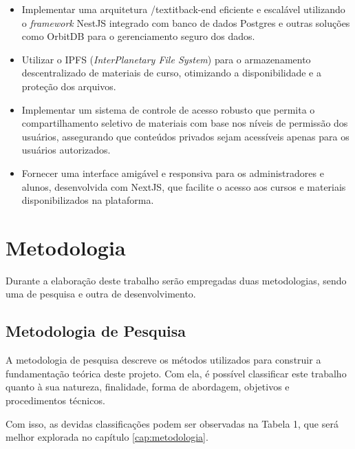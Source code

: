 \begin{itemize}
    \item Implementar uma arquitetura /textit{back-end} eficiente e escalável utilizando o \textit{framework} NestJS integrado com banco de dados Postgres e outras soluções como OrbitDB para o gerenciamento seguro dos dados.
    \item Utilizar o IPFS (\textit{InterPlanetary File System}) para o armazenamento descentralizado de materiais de curso, otimizando a disponibilidade e a proteção dos arquivos.
    \item Implementar um sistema de controle de acesso robusto que permita o compartilhamento seletivo de materiais com base nos níveis de permissão dos usuários, assegurando que conteúdos privados sejam acessíveis apenas para os usuários autorizados.
    \item Fornecer uma interface amigável e responsiva para os administradores e alunos, desenvolvida com NextJS, que facilite o acesso aos cursos e materiais disponibilizados na plataforma.
\end{itemize}

\section{Metodologia}

Durante a elaboração deste trabalho serão empregadas duas metodologias, sendo uma de pesquisa e outra de desenvolvimento.

\subsection{Metodologia de Pesquisa}

A metodologia de pesquisa descreve os métodos utilizados para construir a fundamentação teórica deste projeto. Com ela, é possível classificar este trabalho quanto à sua natureza, finalidade, forma de abordagem, objetivos e procedimentos técnicos.

Com isso, as devidas classificações podem ser observadas na Tabela 1, que será melhor explorada no capítulo \ref{cap:metodologia}.

\setlength{\extrarowheight}{5pt}

